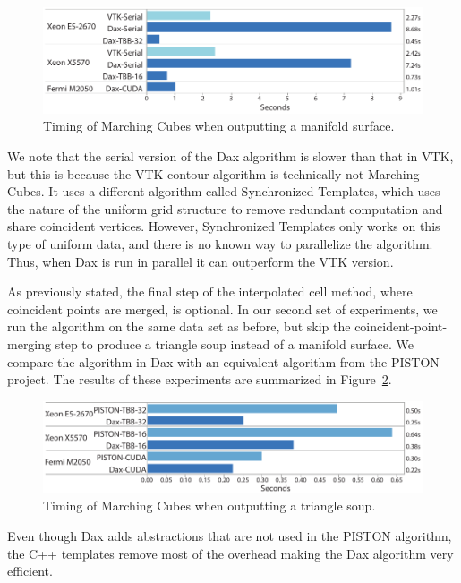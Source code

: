 \begin{figure}[htb]
  \centering
  \includegraphics{images/TimingMCManifold}
  \caption{Timing of Marching Cubes when outputting a manifold surface.}
  \label{fig:TimingMCManifold}
\end{figure}

We note that the serial version of the Dax algorithm is slower than that in
VTK, but this is because the VTK contour algorithm is technically not
Marching Cubes. It uses a different algorithm called Synchronized
Templates, which uses the nature of the uniform grid structure to remove
redundant computation and share coincident vertices. However, Synchronized
Templates only works on this type of uniform data, and there is no known
way to parallelize the algorithm. Thus, when Dax is run in parallel it can
outperform the VTK version.

As previously stated, the final step of the interpolated cell method, where
coincident points are merged, is optional. In our second set of
experiments, we run the algorithm on the same data set as before, but skip
the coincident-point-merging step to produce a triangle soup instead of a
manifold surface. We compare the algorithm in Dax with an equivalent
algorithm from the PISTON project. The results of these experiments are
summarized in Figure~\ref{fig:TimingMCSoup}.

\begin{figure}[htb]
  \centering
  \includegraphics{images/TimingMCSoup}
  \caption{Timing of Marching Cubes when outputting a triangle soup.}
  \label{fig:TimingMCSoup}
\end{figure}

Even though Dax adds abstractions that are not used in the PISTON
algorithm, the C++ templates remove most of the overhead making the Dax
algorithm very efficient.

